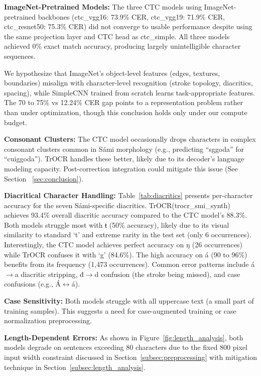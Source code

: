 \documentclass[conference]{IEEEtran}
\newcommand{\preprocessingImgWidth}{800}
\newcommand{\sentenceLengthThreshold}{80}
\begin{document}
\textbf{ImageNet-Pretrained Models:} The three CTC models using ImageNet-pretrained backbones (ctc\_vgg16: 73.9\% CER, ctc\_vgg19: 71.9\% CER, ctc\_resnet50: 75.3\% CER) did not converge to usable performance despite using the same projection layer and CTC head as ctc\_simple. All three models achieved 0\% exact match accuracy, producing largely unintelligible character sequences.

We hypothesize that ImageNet's object-level features (edges, textures, boundaries) misalign with character-level recognition (stroke topology, diacritics, spacing), while SimpleCNN trained from scratch learns task-appropriate features. The 70 to 75\% vs 12.24\% CER gap points to a representation problem rather than under optimization, though this conclusion holds only under our compute budget.


\textbf{Consonant Clusters:} The CTC model occasionally drops characters in complex consonant clusters common in S\'{a}mi morphology (e.g., predicting ``sggoda'' for ``cuiggoda''). TrOCR handles these better, likely due to its decoder's language modeling capacity. Post-correction integration could mitigate this issue (See Section ~\ref{sec:conclusion}). 

\textbf{Diacritical Character Handling:} Table~\ref{tab:diacritics} presents per-character accuracy for the seven S\'{a}mi-specific diacritics. TrOCR(trocr\_smi\_synth) achieves 93.4\% overall diacritic accuracy compared to the CTC model's 88.3\%. Both models struggle most with ŧ (50\% accuracy), likely due to its visual similarity to standard `t' and extreme rarity in the test set (only 6 occurrences). Interestingly, the CTC model achieves perfect accuracy on ŋ (26 occurrences) while TrOCR confuses it with `g' (84.6\%). The high accuracy on \'{a} (90 to 96\%) benefits from its frequency (1,473 occurrences). Common error patterns include \'{a}$\rightarrow$a diacritic stripping, đ$\rightarrow$d confusion (the stroke being missed), and case confusions (e.g., \'{A}$\leftrightarrow$\'{a}).


\textbf{Case Sensitivity:} Both models struggle with all uppercase text (a small part of training samples). This suggests a need for case-augmented training or case normalization preprocessing. 

\textbf{Length-Dependent Errors:} As shown in Figure~\ref{fig:length_analysis}, both models degrade on sentences exceeding \sentenceLengthThreshold{} characters due to the fixed \preprocessingImgWidth{} pixel input width constraint discussed in Section~\ref{subsec:preprocessing} with mitigation technique in Section~\ref{subsec:length_analysis}.
\end{document}
